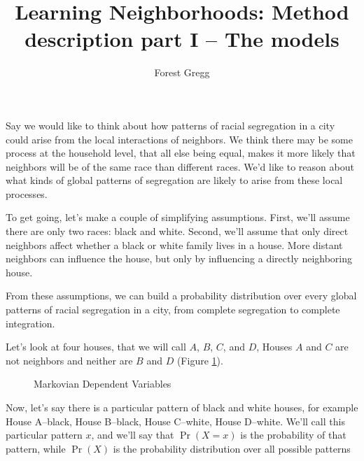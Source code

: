 \documentclass{article}
\title{Learning Neighborhoods: Method description part I -- The models}
\author{Forest Gregg}
\begin{document}
\maketitle
Say we would like to think about how patterns of racial segregation in
a city could arise from the local interactions of neighbors. We think
there may be some process at the household level, that all else being
equal, makes it more likely that neighbors will be of the same race
than different races. We'd like to reason about what kinds of global
patterns of segregation are likely to arise from these local
processes.

To get going, let's make a couple of simplifying assumptions. First,
we'll assume there are only two races: black and white. Second, we'll
assume that only direct neighbors affect whether a black or white
family lives in a house. More distant neighbors can influence the
house, but only by influencing a directly neighboring house.

From these assumptions, we can build a probability distribution over
every global patterns of racial segregation in a city, from complete
segregation to complete integration.


Let's look at four houses, that we will call $A$, $B$, $C$, and $D$,
Houses $A$ and $C$ are not neighbors and neither are $B$ and $D$ (Figure \ref{fig:mdv}).


\begin{figure}
\centering
{}
\caption{Markovian Dependent Variables}
\label{fig:mdv}
\end{figure}


Now, let's say there is a particular pattern of black and white
houses, for example House A--black, House B--black, House C--white,
House D--white. We'll call this particular pattern $x$, and we'll say
that $\Pr(X=x)$ is the probability of that pattern, while $\Pr(X)$ is
the probability distribution over all possible patterns
\end{document}
